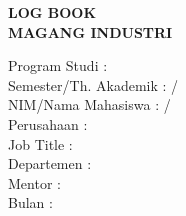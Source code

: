 \newpage
\TabPositions{4.5cm}

\begin{center}
    \textbf{LOG BOOK \\ MAGANG INDUSTRI}
\end{center}

\raggedright%
Program Studi           \tab: {\studyprogram} \\
Semester/Th. Akademik   \tab: {\semester} / {\academicperiod} \\
NIM/Nama Mahasiswa      \tab: {\authornim} / {\authorname} \\
Perusahaan              \tab: {\company} \\
Job Title               \tab: {\jobposition} \\
Departemen              \tab: {\jobdepartment} \\
Mentor                  \tab: {\mentor} \\
Bulan                   \tab: {\reportmonth} {\reportyear} \\
\vspace{12pt}
